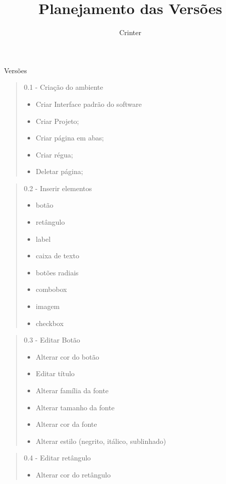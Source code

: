 \documentclass[10pt,a4paper]{article}
\author{Crinter}
\title{Planejamento das Versões}
\date{}
\begin{document}
\maketitle
\newpage
\begin{center}
Versões
\end{center}


\begin{quote}
0.1 - Criação do ambiente
\begin{itemize}
\item Criar Interface padrão do software
\item Criar Projeto;
\item Criar página em abas;
\item Criar régua;
\item Deletar página;
\end{itemize}
\end{quote}

\begin{quote}

0.2 - Inserir elementos
\begin{itemize}
\item botão
\item retângulo
\item label
\item caixa de texto
\item botões radiais
\item combobox 
\item imagem
\item checkbox
\end{itemize}
\end{quote}


\begin{quote}
0.3 - Editar Botão
\begin{itemize}
\item Alterar cor do botão
\item Editar título
\item Alterar família da fonte
\item Alterar tamanho da fonte
\item Alterar cor da fonte
\item Alterar estilo (negrito, itálico, sublinhado)
\end{itemize}
\end{quote}

\begin{quote}

0.4 - Editar retângulo
\begin{itemize}
\item Alterar cor do retângulo
\end{itemize}
\end{quote}
\end{document}
